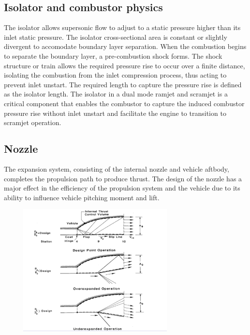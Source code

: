 \documentclass[12pt]{article}
\begin{document}
\subsection{Isolator and combustor physics}

The isolator allows supersonic flow to adjust to a static pressure higher than its inlet static pressure. The isolator cross-sectional area is constant or slightly divergent to accomodate boundary layer separation. When the combustion begins to separate the boundary layer, a pre-combustion shock forms. The shock structure or train allows the required pressure rise to occur over a finite distance, isolating the combustion from the inlet compression process, thus acting to prevent inlet unstart. The required length to capture the pressure rise is defined as the isolator length. The isolator in a dual mode ramjet and scramjet is a critical component that enables the combustor to capture the induced combustor pressure rise without inlet unstart and facilitate the engine to transition to scramjet operation.

\subsection{Nozzle}

The expansion system, consisting of the internal nozzle and vehicle aftbody, completes the propulsion path to produce thrust. The design of the nozzle has a major effect in the efficiency of the propulsion system and the vehicle due to its ability to influence vehicle pitching moment and lift.

\begin{figure}[h!]
\centering
\includegraphics[width=0.7\textwidth]{figures/scramnozzle.png}
\end{figure}
\end{document}
